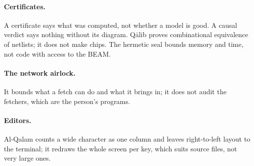 \paragraph{Certificates.} A certificate says what was computed, not whether a model is good. A causal
verdict says nothing without its diagram. Qālib proves combinational equivalence of netlists; it does not
make chips. The hermetic seal bounds memory and time, not code with access to the BEAM.

\paragraph{The network airlock.} It bounds what a fetch can do and what it brings in; it does not audit
the fetchers, which are the person's programs.

\paragraph{Editors.} Al-Qalam counts a wide character as one column and leaves right-to-left layout to
the terminal; it redraws the whole screen per key, which suits source files, not very large ones.
